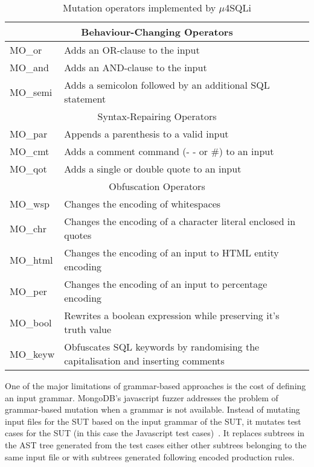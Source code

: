 \begin{table}[h]
\caption{Mutation operators implemented by $\mu$4SQLi}
\label{table:Mu4SQLI}
\begin{tabular}{|p{2cm}|p{11.5cm}|}
\hline
\multicolumn{2}{|c|}{Behaviour-Changing Operators}\\
\hline
MO\_or&Adds an OR-clause to the input\\
MO\_and&Adds an AND-clause to the input\\
MO\_semi&Adds a semicolon followed by an additional SQL statement\\
\hline
\multicolumn{2}{|c|}{Syntax-Repairing Operators}\\
\hline
MO\_par&Appends a parenthesis to a valid input\\
MO\_cmt&Adds a comment command (- - or \#) to an input\\
MO\_qot&Adds a single or double quote to an input\\
\hline
\multicolumn{2}{|c|}{Obfuscation Operators}\\
\hline
MO\_wsp&Changes the encoding of whitespaces \\
MO\_chr&Changes the encoding of a character literal enclosed in quotes\\
MO\_html&Changes the encoding of an input to HTML entity encoding\\
MO\_per&Changes the encoding of an input to percentage encoding\\
MO\_bool&Rewrites a boolean expression while preserving it's truth value\\
MO\_keyw&Obfuscates SQL keywords by randomising the capitalisation and inserting comments\\
\hline
\end{tabular}
\end{table}



One of the major limitations of grammar-based approaches is the cost of defining an input grammar. MongoDB's javascript fuzzer addresses the problem of grammar-based mutation when a grammar is not available. Instead of mutating input files for the SUT based on the input grammar of  the SUT, it mutates test cases for the SUT (in this case the Javascript test cases)~\MongoDB. It replaces subtrees in the AST tree generated from the test cases either other subtrees belonging to the same input file or with subtrees generated following encoded production rules.





